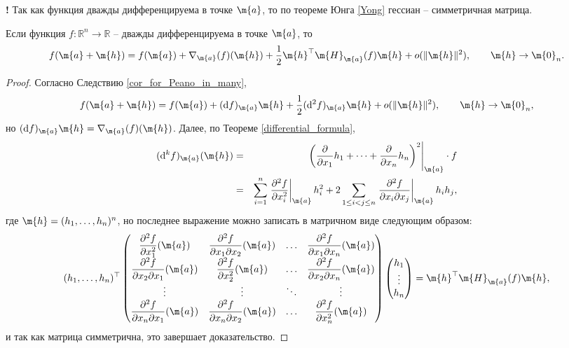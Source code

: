 \begin{mydanger}{\bf{!}}
    Так как функция дважды дифференцируема в точке $\m{a}$, то по теореме Юнга \ref{Yong} гессиан -- симметричная матрица.
\end{mydanger}

\begin{theorem}\label{Tayl_for_2}
    Если функция $f:\mathbb{R}^n \to \mathbb{R}$ -- дважды дифференцируема в точке $\m{a}$, то
    \[
     f(\m{a} + \m{h}) =f(\m{a}) + \nabla_\m{a}(f)(\m{h}) + \frac{1}{2} \m{h}^\top \m{H}_\m{a}(f) \m{h} + o(\|\m{h}\|^2), \qquad \m{h} \to \m{0}_n.
    \]
\end{theorem}
\begin{proof}
    Согласно Следствию \ref{cor_for_Peano_in_many}, 
    \[
     f(\m{a} + \m{h}) = f(\m{a}) + (\mathrm{d}f)_\m{a} \m{h} + \frac{1}{2} (\mathrm{d}^2f)_\m{a}\m{h} + o(\| \m{h} \|^2), \qquad \m{h} \to \m{0}_n,
    \]
    но $(\mathrm{d}f)_\m{a} \m{h} = \nabla_\m{a}(f)(\m{h})$. Далее, по Теореме \ref{differential_formula},
\begin{eqnarray*}
    (\mathrm{d}^kf)_\m{a}(\m{h})  &=& \left.\left(\frac{\partial}{\partial x_1} h_1 + \cdots + \frac{\partial }{\partial x_n}h_n \right)^2\right|_{\m{a}} \cdot f \\
    &=& \sum_{i=1}^n \left.\dfrac{\partial^2 f}{\partial x_i^2} \right|_\m{a} h_i^2 + 2 \sum_{1\le i < j \le n}  \left.\dfrac{\partial^2 f}{\partial x_i \partial x_j} \right|_{\m{a}} h_ih_j,
\end{eqnarray*}
где $\m{h} = (h_1, \ldots, h_n)^n$, но последнее выражение можно записать в матричном виде следующим образом:
\[
 (h_1, \ldots, h_n)^\top \begin{pmatrix}
         \dfrac{\partial^2 f}{\partial x_1^2}(\m{a}) & \dfrac{\partial^2 f}{\partial x_1 \partial x_2}(\m{a}) &\ldots & \dfrac{\partial^2 f}{\partial x_1 \partial x_n}(\m{a}) \\
         \dfrac{\partial^2 f}{\partial x_2 \partial x_1}(\m{a}) & \dfrac{\partial^2 f}{\partial x_2^2}(\m{a}) & \ldots & \dfrac{\partial^2 f}{\partial x_2 \partial x_n}(\m{a}) \\
         \vdots & \vdots & \ddots & \vdots \\
         \dfrac{\partial^2 f}{\partial x_n \partial x_1}(\m{a}) & \dfrac{\partial^2 f}{\partial x_n \partial x_2}(\m{a}) & \ldots &\dfrac{\partial^2 f}{ \partial x_n^2}(\m{a})
     \end{pmatrix} \begin{pmatrix}
         h_1 \\ \vdots \\ h_n
     \end{pmatrix}  =  \m{h}^\top \m{H}_\m{a}(f) \m{h} ,
\]
и так как матрица симметрична, это завершает доказательство.
\end{proof}

